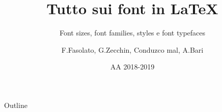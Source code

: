 \documentclass[dvipsnames]{beamer}
\title{Tutto sui font in \LaTeX}
\subtitle{Font sizes, font families, styles e font typefaces}
\author{F.Fasolato, G.Zecchin, Conduzco mal, A.Bari}
\date{AA 2018-2019}
\begin{document}
    \maketitle
    \begin{frame}{Outline}
        \tableofcontents
    \end{frame}
    
\end{document}
